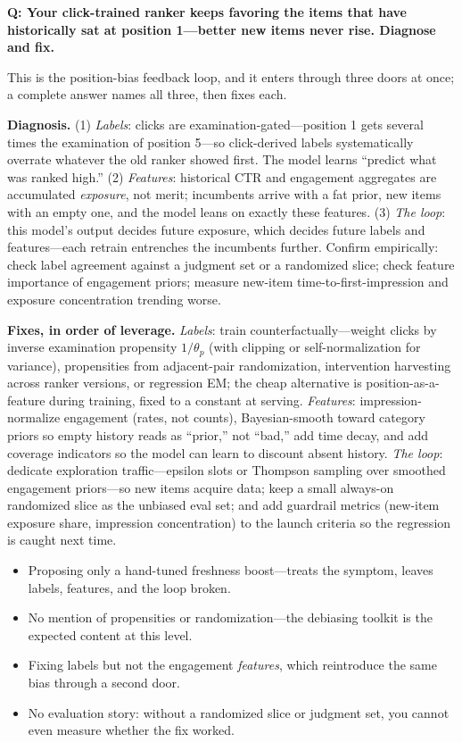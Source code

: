 \begin{interviewq}
\textbf{Q: Your click-trained ranker keeps favoring the items that have historically sat at position 1---better new items never rise. Diagnose and fix.}

 \quad {} \quad \badgefreq{\freqhigh}

\stronganswer

This is the position-bias feedback loop, and it enters through three doors at once; a complete answer names all three, then fixes each.

\textbf{Diagnosis.} (1) \textit{Labels}: clicks are examination-gated---position 1 gets several times the examination of position 5---so click-derived labels systematically overrate whatever the old ranker showed first. The model learns ``predict what was ranked high.'' (2) \textit{Features}: historical CTR and engagement aggregates are accumulated \textit{exposure}, not merit; incumbents arrive with a fat prior, new items with an empty one, and the model leans on exactly these features. (3) \textit{The loop}: this model's output decides future exposure, which decides future labels and features---each retrain entrenches the incumbents further. Confirm empirically: check label agreement against a judgment set or a randomized slice; check feature importance of engagement priors; measure new-item time-to-first-impression and exposure concentration trending worse.

\textbf{Fixes, in order of leverage.} \textit{Labels}: train counterfactually---weight clicks by inverse examination propensity $1/\theta_p$ (with clipping or self-normalization for variance), propensities from adjacent-pair randomization, intervention harvesting across ranker versions, or regression EM; the cheap alternative is position-as-a-feature during training, fixed to a constant at serving. \textit{Features}: impression-normalize engagement (rates, not counts), Bayesian-smooth toward category priors so empty history reads as ``prior,'' not ``bad,'' add time decay, and add coverage indicators so the model can learn to discount absent history. \textit{The loop}: dedicate exploration traffic---epsilon slots or Thompson sampling over smoothed engagement priors---so new items acquire data; keep a small always-on randomized slice as the unbiased eval set; and add guardrail metrics (new-item exposure share, impression concentration) to the launch criteria so the regression is caught next time.

\redflags
\begin{itemize}
    \item Proposing only a hand-tuned freshness boost---treats the symptom, leaves labels, features, and the loop broken.
    \item No mention of propensities or randomization---the debiasing toolkit is the expected content at this level.
    \item Fixing labels but not the engagement \textit{features}, which reintroduce the same bias through a second door.
    \item No evaluation story: without a randomized slice or judgment set, you cannot even measure whether the fix worked.
\end{itemize}


\end{interviewq}

